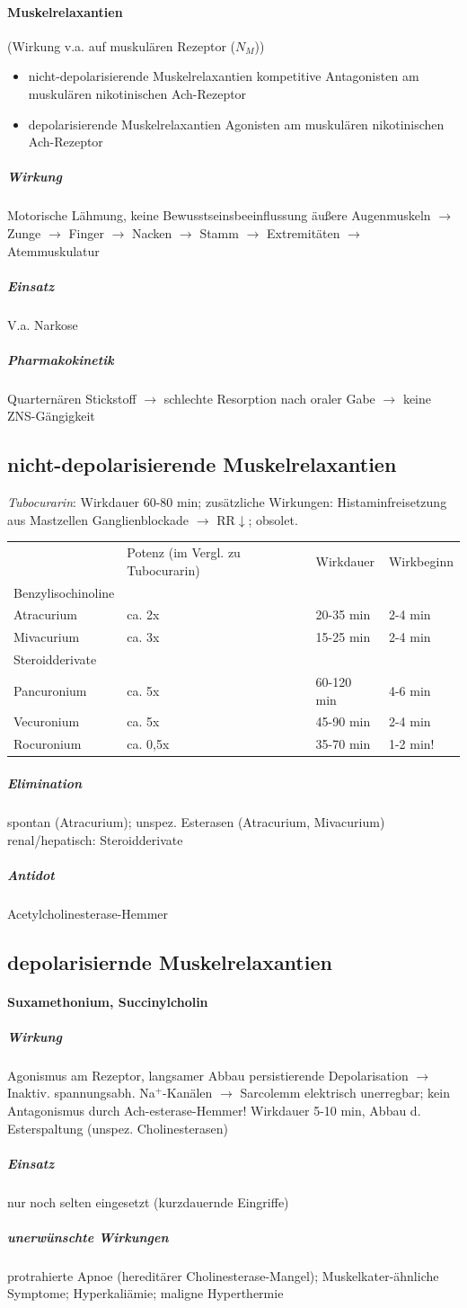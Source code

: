 \documentclass[10pt,a4paper]{report}
\begin{document}
\paragraph{Muskelrelaxantien}(Wirkung v.a. auf muskulären Rezeptor ($N_M$))
\begin{itemize}
	\item nicht-depolarisierende Muskelrelaxantien kompetitive Antagonisten am muskulären nikotinischen Ach-Rezeptor
	\item depolarisierende Muskelrelaxantien Agonisten am muskulären nikotinischen Ach-Rezeptor
\end{itemize}
\subparagraph{Wirkung} Motorische Lähmung, keine Bewusstseinsbeeinflussung
äußere Augenmuskeln $\rightarrow$ Zunge $\rightarrow$ Finger $\rightarrow$ Nacken $\rightarrow$ Stamm $\rightarrow$ Extremitäten $\rightarrow$ Atemmuskulatur
\subparagraph{Einsatz} V.a. Narkose
\subparagraph{Pharmakokinetik} Quarternären Stickstoff $\rightarrow$ schlechte Resorption nach oraler Gabe $\rightarrow$ keine ZNS-Gängigkeit
\subsection{nicht-depolarisierende Muskelrelaxantien}
\textit{Tubocurarin}: Wirkdauer 60-80 min; zusätzliche Wirkungen: Histaminfreisetzung aus Mastzellen Ganglienblockade $\rightarrow$ RR$\downarrow$;  obsolet.
\begin{tabularx}{\textwidth}{XXXX}
&Potenz (im Vergl. zu Tubocurarin)&Wirkdauer&Wirkbeginn\\
Benzylisochinoline&&&\\
Atracurium&ca. 2x&20-35 min&2-4 min\\
Mivacurium&ca. 3x&15-25 min&2-4 min\\
Steroidderivate&&&\\
Pancuronium&ca. 5x&60-120 min&4-6 min\\
Vecuronium&ca. 5x&45-90 min&2-4 min\\
Rocuronium&ca. 0,5x&35-70 min&1-2 min!\\
\end{tabularx}
\subparagraph{Elimination}spontan (Atracurium); unspez. Esterasen (Atracurium, Mivacurium) renal/hepatisch: Steroidderivate
\subparagraph{Antidot} Acetylcholinesterase-Hemmer
\subsection{depolarisiernde Muskelrelaxantien}
\paragraph{Suxamethonium, Succinylcholin}
\subparagraph{Wirkung} Agonismus am Rezeptor, langsamer Abbau persistierende Depolarisation $\rightarrow$ Inaktiv. spannungsabh. Na$^+$-Kanälen $\rightarrow$ Sarcolemm elektrisch unerregbar; kein Antagonismus durch Ach-esterase-Hemmer! Wirkdauer 5-10 min, Abbau d. Esterspaltung (unspez. Cholinesterasen)
\subparagraph{Einsatz}  nur noch selten eingesetzt (kurzdauernde Eingriffe)
\subparagraph{unerwünschte Wirkungen} protrahierte Apnoe (hereditärer Cholinesterase-Mangel); Muskelkater-ähnliche Symptome; Hyperkaliämie;  maligne Hyperthermie
\end{document}
